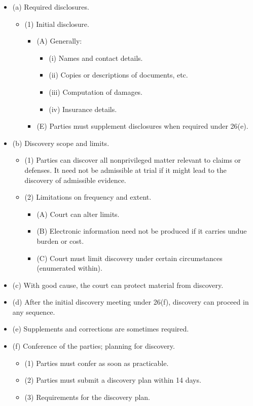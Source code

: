 \begin{itemize}
    \item (a) Required disclosures.
    \begin{itemize}
        \item (1) Initial disclosure.
        \begin{itemize}
            \item (A) Generally:
            \begin{itemize}
                \item (i) Names and contact details.
                \item (ii) Copies or descriptions of documents, etc.
                \item (iii) Computation of damages.
                \item (iv) Insurance details.
            \end{itemize}
            \item (E) Parties must supplement disclosures when required under 26(e).
        \end{itemize}
    \end{itemize}
    \item (b) Discovery scope and limits.
    \begin{itemize}
        \item (1) Parties can discover all nonprivileged matter relevant to claims or defenses. It need not be admissible at trial if it might lead to the discovery of admissible evidence.
        \item (2) Limitations on frequency and extent.
        \begin{itemize}
            \item (A) Court can alter limits.
            \item (B) Electronic information need not be produced if it carries undue burden or cost.
            \item (C) Court must limit discovery under certain circumstances (enumerated within).
        \end{itemize}
    \end{itemize}
    \item (c) With good cause, the court can protect material from discovery.
    \item (d) After the initial discovery meeting under 26(f), discovery can proceed in any sequence.
    \item (e) Supplements and corrections are sometimes required.
    \item (f) Conference of the parties; planning for discovery.
    \begin{itemize}
        \item (1) Parties must confer as soon as practicable.
        \item (2) Parties must submit a discovery plan within 14 days.
        \item (3) Requirements for the discovery plan.
    \end{itemize}
\end{itemize}

